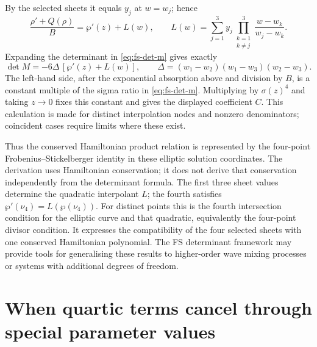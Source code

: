 \documentclass[11pt,a4paper]{article}
\numberwithin{equation}{section}
\begin{document}
By the selected sheets it equals $y_j$ at $w=w_j$; hence
\begin{equation}
\frac{\rho'+Q(\rho)}{B}=\wp'(z)+L(w),\qquad
L(w)=\sum_{j=1}^{3}y_j
\prod_{\substack{k=1\\k\ne j}}^{3}\frac{w-w_k}{w_j-w_k}.
\end{equation}
Expanding the determinant in \eqref{eq:fs-det-m} gives exactly
\begin{equation}
\det M=-6\Delta\,[\wp'(z)+L(w)],\qquad
\Delta=(w_1-w_2)(w_1-w_3)(w_2-w_3).
\end{equation}
The left-hand side, after the exponential absorption above and division by $B$, is a constant multiple of the sigma ratio in \eqref{eq:fs-det-m}.
Multiplying by $\sigma(z)^4$ and taking $z\to0$ fixes this constant and gives the displayed coefficient $C$.
This calculation is made for distinct interpolation nodes and nonzero denominators; coincident cases require limits where these exist.

Thus the conserved Hamiltonian product relation is represented by the four-point Frobenius--Stickelberger identity in these elliptic solution coordinates.
The derivation uses Hamiltonian conservation; it does not derive that conservation independently from the determinant formula.
The first three sheet values determine the quadratic interpolant $L$; the fourth satisfies $\wp'(\nu_4)=L(\wp(\nu_4))$.
For distinct points this is the fourth intersection condition for the elliptic curve and that quadratic, equivalently the four-point divisor condition.
It expresses the compatibility of the four selected sheets with one conserved Hamiltonian polynomial.
The FS determinant framework may provide tools for generalising these results to higher-order wave mixing processes or systems with additional degrees of freedom.


\section{When quartic terms cancel through special parameter values}
\label{sec:cubic-case}
\end{document}
